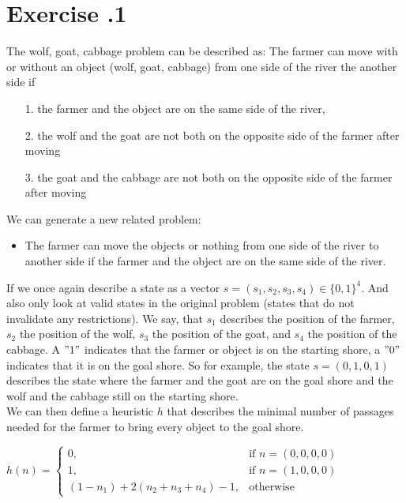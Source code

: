 \documentclass[11pt]{scrartcl}
\author{Oliver Strassmann \\
        Julia Kostadinova \\
        Alessio Brazerol}
\newcounter{sheetnr}
\newenvironment{exercise}[2][]{\section*{Exercise \thesheetnr.#2\expandafter\ifstrempty\expandafter{#1}{}{\ (#1)}}}{}
\newenvironment{subexercises}{\begin{enumerate}[a), font=\bfseries, wide, labelindent=0pt]}{\end{enumerate}}
\begin{document}
		\begin{exercise}[Heuristics]{1}
        \begin{subexercises}
            \item The wolf, goat, cabbage problem can be     described as:
            The farmer can move with or without an object (wolf, goat, cabbage) from one side of the river the another side if
            \begin{itemize}
                \item[1.] the farmer and the object are on the same side of the river,
                \item[2.] the wolf and the goat are not both on the opposite side of the farmer after moving
                \item[3.] the goat and the cabbage are not both on the opposite side of the farmer after moving
            \end{itemize}
                We can generate a new related problem:
            \begin{itemize}
                \item The farmer can move the objects or nothing from one side of the river to another side if the farmer and the object are on the same side of the river.
            \end{itemize}
            If we once again describe a state as a vector $s = (s_1, s_2, s_3, s_4) \in \{0,1\}^4$. And also only look at valid states in the original problem (states that do not invalidate any restrictions). We say, that $s_1$ describes the position of the farmer, $s_2$ the position of the wolf, $s_3$ the position of the goat, and $s_4$ the position of the cabbage. A $"1"$ indicates that the farmer or object is on the starting shore, a $"0"$ indicates that it is on the goal shore. So for example, the state $s=(0,1,0,1)$ describes the state where the farmer and the goat are on the goal shore and the wolf and the cabbage still on the starting shore. \\
            
            We can then define a heuristic $h$ that describes the minimal number of passages needed for the farmer to bring every object to the goal shore. 
            
            \begin{center}
                \item $h(n) = 
                    \begin{cases}
                        0,& \text{if } n = (0,0,0,0)\\
                        1,& \text{if } n = (1,0,0,0)\\ 
                        (1 - n_1) + 2(n_2 + n_3 + n_4) - 1,& \text{otherwise}
                    \end{cases}$ \\
            \end{center}
            

\end{subexercises}
\end{exercise}
\end{document}
